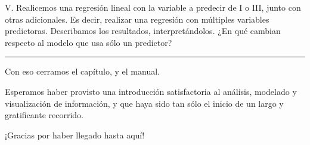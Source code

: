 \documentclass[
]{book}
\begin{document}
V. Realicemos una regresión lineal con la variable a predecir de I o III, junto con otras adicionales. Es decir, realizar una regresión con múltiples variables predictoras. Describamos los resultados, interpretándolos. ¿En qué cambian respecto al modelo que usa sólo un predictor?

\begin{center}\rule{0.5\linewidth}{0.5pt}\end{center}

Con eso cerramos el capítulo, y el manual.

Esperamos haber provisto una introducción satisfactoria al análisis, modelado y visualización de información, y que haya sido tan sólo el inicio de un largo y gratificante recorrido.

¡Gracias por haber llegado hasta aquí!

  
\end{document}
